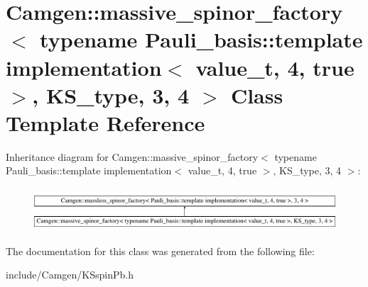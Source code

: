 \hypertarget{a00350}{}\section{Camgen\+:\+:massive\+\_\+spinor\+\_\+factory$<$ typename Pauli\+\_\+basis\+:\+:template implementation$<$ value\+\_\+t, 4, true $>$, K\+S\+\_\+type, 3, 4 $>$ Class Template Reference}
\label{a00350}
Inheritance diagram for Camgen\+:\+:massive\+\_\+spinor\+\_\+factory$<$ typename Pauli\+\_\+basis\+:\+:template implementation$<$ value\+\_\+t, 4, true $>$, K\+S\+\_\+type, 3, 4 $>$\+:\begin{figure}[H]
\begin{center}
\leavevmode
\includegraphics[height=1.618497cm]{a00350}
\end{center}
\end{figure}


The documentation for this class was generated from the following file\+:\begin{DoxyCompactItemize}
\item 
include/\+Camgen/K\+Sspin\+Pb.\+h\end{DoxyCompactItemize}
